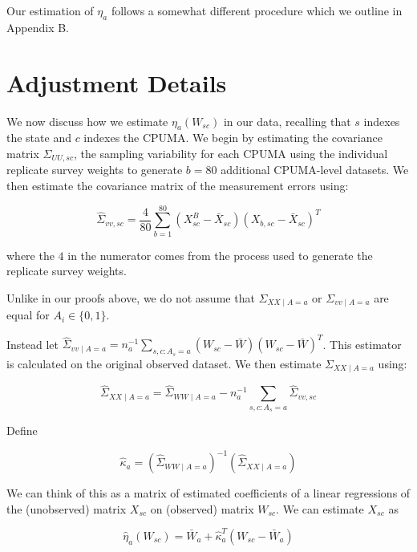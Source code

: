 Our estimation of $\eta_a$ follows a somewhat different procedure which we outline in Appendix B.

\section{Adjustment Details}

We now discuss how we estimate $\eta_a(W_{sc})$ in our data, recalling that $s$ indexes the state and $c$ indexes the CPUMA. We begin by estimating the covariance matrix $\Sigma_{UU, sc}$, the sampling variability for each CPUMA using the individual replicate survey weights to generate $b = 80$ additional CPUMA-level datasets. We then estimate the covariance matrix of the measurement errors using:

\begin{equation}
\hat{\Sigma}_{vv, sc} = \frac{4}{80}\sum_{b=1}^{80}(X_{sc}^B - \bar{X}_{sc})(X_{b, sc} - \bar{X}_{sc})^T
\end{equation}

where the $4$ in the numerator comes from the process used to generate the replicate survey weights. 

Unlike in our proofs above, we do not assume that $\Sigma_{XX \mid A = a}$ or $\Sigma_{vv \mid A = a}$ are equal for $A_i \in \{0, 1\}$.

Instead let $\hat{\Sigma}_{vv \mid A = a} = n_a^{-1}\sum_{s, c: A_s = a} (W_{sc} - \bar{W})(W_{sc} - \bar{W})^T$. This estimator is calculated on the original observed dataset. We then estimate $\Sigma_{XX \mid A = a}$ using:

\begin{equation}
\hat{\Sigma}_{XX \mid A = a} = \hat{\Sigma}_{WW \mid A = a} - n_a^{-1}\sum_{s, c: A_s = a} \hat{\Sigma}_{vv, sc}
\end{equation}

Define

\begin{equation}
\hat{\kappa}_a = (\hat{\Sigma}_{WW \mid A = a})^{-1}(\hat{\Sigma}_{XX \mid A = a})
\end{equation}

We can think of this as a matrix of estimated coefficients of a linear regressions of the (unobserved) matrix $X_{sc}$ on (observed) matrix $W_{sc}$. We can estimate $X_{sc}$ as

\begin{equation}
\hat{\eta}_a(W_{sc}) = \bar{W}_a + \hat{\kappa}_a^T(W_{sc} - \bar{W}_a)
\end{equation}

